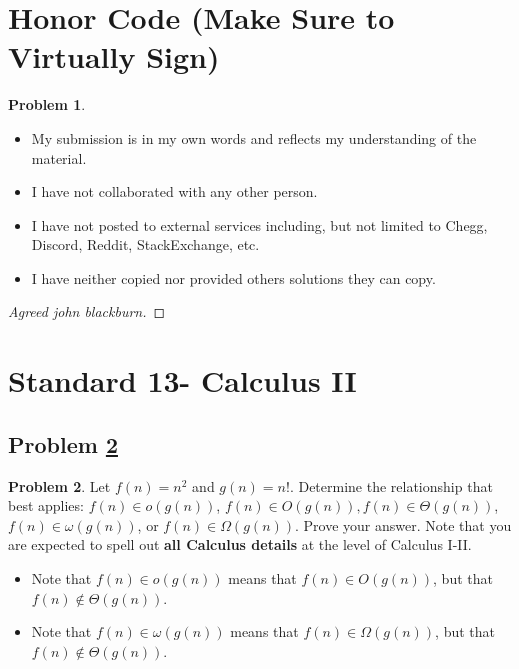 \documentclass[11pt]{article}
\theoremstyle{definition}
\theoremstyle{definition}
\newtheorem{required}{Problem}
\theoremstyle{definition}
\begin{document}
\section{Honor Code (Make Sure to Virtually Sign)} \label{HonorCode}

\begin{required}
\noindent 
\begin{itemize}
\item My submission is in my own words and reflects my understanding of the material.
\item I have not collaborated with any other person.
\item I have not posted to external services including, but not limited to Chegg, Discord, Reddit, StackExchange, etc.
\item I have neither copied nor provided others solutions they can copy.
\end{itemize}

\end{required}

\begin{proof}[Agreed john blackburn]
\end{proof}


\newpage
\section{Standard 13- Calculus II}

\subsection{Problem \ref{Safe1}}
\begin{required} \label{Safe1}
Let $f(n) = n^{2}$ and $g(n) = n!$. Determine the relationship that best applies: $f(n) \in o(g(n))$, $f(n) \in O(g(n)), f(n) \in \Theta(g(n))$, $f(n) \in \omega(g(n))$, or $f(n) \in \Omega(g(n))$. Prove your answer. Note that you are expected to spell out \textbf{all Calculus details} at the level of Calculus I-II.
\begin{itemize}
\item Note that $f(n) \in o(g(n))$ means that $f(n) \in O(g(n))$, but that $f(n) \not \in \Theta(g(n))$.
\item Note that $f(n) \in \omega(g(n))$ means that $f(n) \in \Omega(g(n))$, but that $f(n) \not \in \Theta(g(n))$.
\end{itemize}
\end{required}
\end{document}
